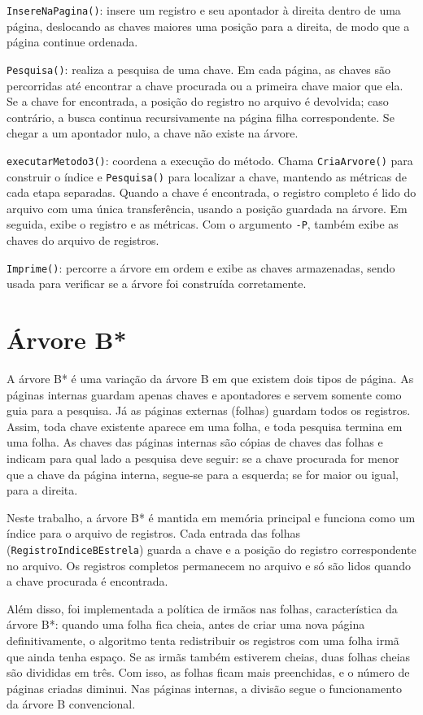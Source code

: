 \documentclass[12pt,a4paper]{article}
\begin{document}
\texttt{InsereNaPagina()}: insere um registro e seu apontador à direita dentro de uma
página, deslocando as chaves maiores uma posição para a direita, de modo que a página
continue ordenada.

\texttt{Pesquisa()}: realiza a pesquisa de uma chave. Em cada página, as chaves são
percorridas até encontrar a chave procurada ou a primeira chave maior que ela. Se a
chave for encontrada, a posição do registro no arquivo é devolvida; caso contrário, a
busca continua recursivamente na página filha correspondente. Se chegar a um apontador nulo, a chave não existe na árvore.

\texttt{executarMetodo3()}: coordena a execução do método. Chama \texttt{CriaArvore()} para construir o índice e \texttt{Pesquisa()} para localizar a chave, mantendo as métricas de cada etapa separadas. Quando a chave é encontrada, o registro completo é lido do arquivo com uma única transferência, usando a posição guardada na árvore. Em seguida, exibe o registro e as métricas. Com o argumento \texttt{-P}, também exibe as chaves do arquivo de registros.

\texttt{Imprime()}: percorre a árvore em ordem e exibe as chaves armazenadas, sendo usada para verificar se a árvore foi construída corretamente.

\newpage

\section{Árvore B*}

A árvore B* é uma variação da árvore B em que existem dois tipos de página. As páginas
internas guardam apenas chaves e apontadores e servem somente como guia para a
pesquisa. Já as páginas externas (folhas) guardam todos os registros. Assim, toda
chave existente aparece em uma folha, e toda pesquisa termina em uma folha. As chaves
das páginas internas são cópias de chaves das folhas e indicam para qual lado a
pesquisa deve seguir: se a chave procurada for menor que a chave da página interna,
segue-se para a esquerda; se for maior ou igual, para a direita.

Neste trabalho, a árvore B* é mantida em memória principal e funciona como um índice
para o arquivo de registros. Cada entrada das folhas (\texttt{RegistroIndiceBEstrela})
guarda a chave e a posição do registro correspondente no arquivo. Os registros
completos permanecem no arquivo e só são lidos quando a chave procurada é encontrada.

Além disso, foi implementada a política de irmãos nas folhas, característica da árvore
B*: quando uma folha fica cheia, antes de criar uma nova página definitivamente, o
algoritmo tenta redistribuir os registros com uma folha irmã que ainda tenha espaço.
Se as irmãs também estiverem cheias, duas folhas cheias são divididas em três. Com
isso, as folhas ficam mais preenchidas, e o número de páginas criadas diminui. Nas
páginas internas, a divisão segue o funcionamento da árvore B convencional.
\end{document}
